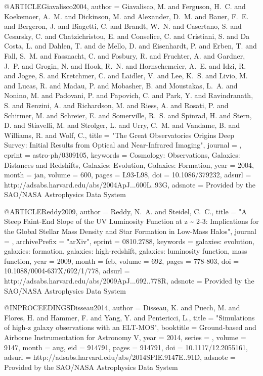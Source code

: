\documentclass{aa}
\begin{document}
{{{{@ARTICLE{Giavalisco2004,
   author = {{Giavalisco}, M. and {Ferguson}, H.~C. and {Koekemoer}, A.~M. and 
	{Dickinson}, M. and {Alexander}, D.~M. and {Bauer}, F.~E. and 
	{Bergeron}, J. and {Biagetti}, C. and {Brandt}, W.~N. and {Casertano}, S. and 
	{Cesarsky}, C. and {Chatzichristou}, E. and {Conselice}, C. and 
	{Cristiani}, S. and {Da Costa}, L. and {Dahlen}, T. and {de Mello}, D. and 
	{Eisenhardt}, P. and {Erben}, T. and {Fall}, S.~M. and {Fassnacht}, C. and 
	{Fosbury}, R. and {Fruchter}, A. and {Gardner}, J.~P. and {Grogin}, N. and 
	{Hook}, R.~N. and {Hornschemeier}, A.~E. and {Idzi}, R. and 
	{Jogee}, S. and {Kretchmer}, C. and {Laidler}, V. and {Lee}, K.~S. and 
	{Livio}, M. and {Lucas}, R. and {Madau}, P. and {Mobasher}, B. and 
	{Moustakas}, L.~A. and {Nonino}, M. and {Padovani}, P. and {Papovich}, C. and 
	{Park}, Y. and {Ravindranath}, S. and {Renzini}, A. and {Richardson}, M. and 
	{Riess}, A. and {Rosati}, P. and {Schirmer}, M. and {Schreier}, E. and 
	{Somerville}, R.~S. and {Spinrad}, H. and {Stern}, D. and {Stiavelli}, M. and 
	{Strolger}, L. and {Urry}, C.~M. and {Vandame}, B. and {Williams}, R. and 
	{Wolf}, C.},
    title = "{The Great Observatories Origins Deep Survey: Initial Results from Optical and Near-Infrared Imaging}",
  journal = {\apjl},
   eprint = {astro-ph/0309105},
 keywords = {Cosmology: Observations, Galaxies: Distances and Redshifts, Galaxies: Evolution, Galaxies: Formation},
     year = 2004,
    month = jan,
   volume = 600,
    pages = {L93-L98},
      doi = {10.1086/379232},
   adsurl = {http://adsabs.harvard.edu/abs/2004ApJ...600L..93G},
  adsnote = {Provided by the SAO/NASA Astrophysics Data System}
}

@ARTICLE{Reddy2009,
   author = {{Reddy}, N.~A. and {Steidel}, C.~C.},
    title = "{A Steep Faint-End Slope of the UV Luminosity Function at z \~{} 2-3: Implications for the Global Stellar Mass Density and Star Formation in Low-Mass Halos}",
  journal = {\apj},
archivePrefix = "arXiv",
   eprint = {0810.2788},
 keywords = {galaxies: evolution, galaxies: formation, galaxies: high-redshift, galaxies: luminosity function, mass function},
     year = 2009,
    month = feb,
   volume = 692,
    pages = {778-803},
      doi = {10.1088/0004-637X/692/1/778},
   adsurl = {http://adsabs.harvard.edu/abs/2009ApJ...692..778R},
  adsnote = {Provided by the SAO/NASA Astrophysics Data System}
}

@INPROCEEDINGS{Disseau2014,
   author = {{Disseau}, K. and {Puech}, M. and {Flores}, H. and {Hammer}, F. and 
	{Yang}, Y. and {Pentericci}, L.},
    title = "{Simulations of high-z galaxy observations with an ELT-MOS}",
booktitle = {Ground-based and Airborne Instrumentation for Astronomy V},
     year = 2014,
   series = {\procspie},
   volume = 9147,
    month = aug,
      eid = {914791},
    pages = {914791},
      doi = {10.1117/12.2055161},
   adsurl = {http://adsabs.harvard.edu/abs/2014SPIE.9147E..91D},
  adsnote = {Provided by the SAO/NASA Astrophysics Data System}
}

}}}}
\end{document}
